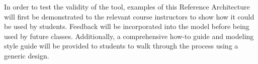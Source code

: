In order to test the validity of the tool, examples of this Reference Architecture will first be demonstrated to the relevant course instructors to show how it could be used by students. Feedback will be incorporated into the model before being used by future classes. Additionally, a comprehensive how-to guide and modeling style guide will be provided to students to walk through the process using a generic design. 
